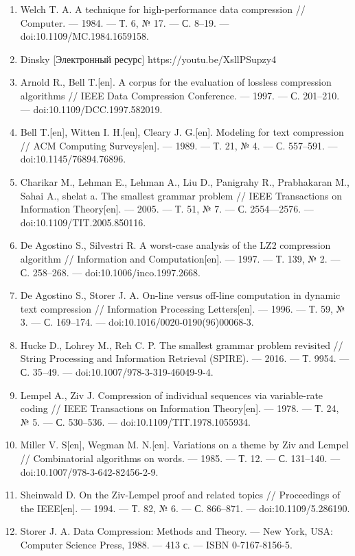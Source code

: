 \documentclass[a4paper]{article}
\begin{document}
\begin{enumerate}
\item Welch T. A. A technique for high-performance data compression // Computer. — 1984. — Т. 6, № 17. — С. 8–19. — doi:10.1109/MC.1984.1659158.
\item Dinsky [Электронный ресурс] https://youtu.be/XsllPSupzy4
\item Arnold R., Bell T.[en]. A corpus for the evaluation of lossless compression algorithms // IEEE Data Compression Conference. — 1997. — С. 201–210. — doi:10.1109/DCC.1997.582019.
\item Bell T.[en], Witten I. H.[en], Cleary J. G.[en]. Modeling for text compression // ACM Computing Surveys[en]. — 1989. — Т. 21, № 4. — С. 557–591. — doi:10.1145/76894.76896.
\item Charikar M., Lehman E., Lehman A., Liu D., Panigrahy R., Prabhakaran M., Sahai A., shelat a. The smallest grammar problem // IEEE Transactions on Information Theory[en]. — 2005. — Т. 51, № 7. — С. 2554—2576. — doi:10.1109/TIT.2005.850116.
\item De Agostino S., Silvestri R. A worst-case analysis of the LZ2 compression algorithm // Information and Computation[en]. — 1997. — Т. 139, № 2. — С. 258–268. — doi:10.1006/inco.1997.2668.
\item De Agostino S., Storer J. A. On-line versus off-line computation in dynamic text compression // Information Processing Letters[en]. — 1996. — Т. 59, № 3. — С. 169–174. — doi:10.1016/0020-0190(96)00068-3.
\item Hucke D., Lohrey M., Reh C. P. The smallest grammar problem revisited // String Processing and Information Retrieval (SPIRE). — 2016. — Т. 9954. — С. 35–49. — doi:10.1007/978-3-319-46049-9-4.
\item Lempel A., Ziv J. Compression of individual sequences via variable-rate coding // IEEE Transactions on Information Theory[en]. — 1978. — Т. 24, № 5. — С. 530–536. — doi:10.1109/TIT.1978.1055934.
\item Miller V. S[en], Wegman M. N.[en]. Variations on a theme by Ziv and Lempel // Combinatorial algorithms on words. — 1985. — Т. 12. — С. 131–140. — doi:10.1007/978-3-642-82456-2-9.
\item Sheinwald D. On the Ziv-Lempel proof and related topics // Proceedings of the IEEE[en]. — 1994. — Т. 82, № 6. — С. 866–871. — doi:10.1109/5.286190.
\item Storer J. A. Data Compression: Methods and Theory. — New York, USA: Computer Science Press, 1988. — 413 с. — ISBN 0-7167-8156-5.

\end{enumerate}
\end{document}
